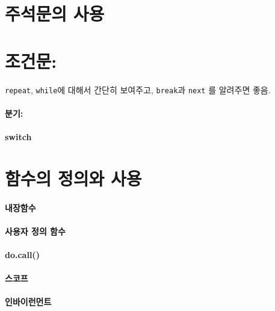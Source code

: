 \documentclass{report}
\begin{document}
\section{주석문의 사용}


\section{조건문:}
\texttt{repeat}, \texttt{while}에 대해서 간단히 보여주고, \texttt{break}과 \texttt{next} 를 알려주면 좋음. 


\paragraph{분기:}

\paragraph{switch}

\section{함수의 정의와 사용}

\paragraph{내장함수}

\paragraph{사용자 정의 함수}

\paragraph{do.call()}

\paragraph{스코프}

\paragraph{인바이런먼트}
\end{document}
